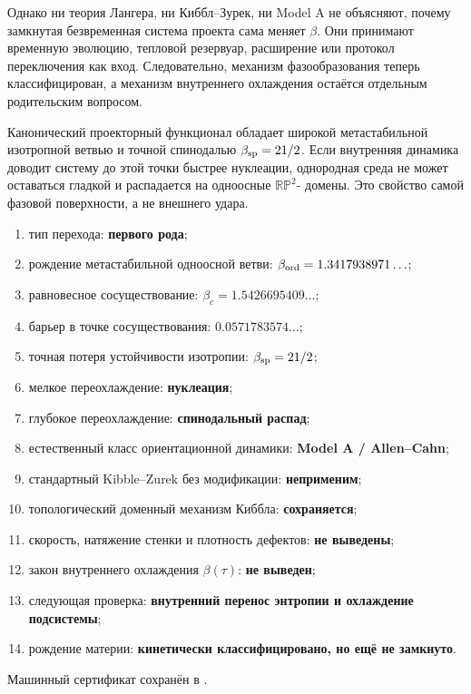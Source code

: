 Однако ни теория Лангера, ни Киббл--Зурек, ни Model A не объясняют, почему
замкнутая безвременная система проекта сама меняет $\beta$. Они принимают
временную эволюцию, тепловой резервуар, расширение или протокол переключения как вход.
Следовательно, механизм фазообразования теперь классифицирован, а механизм
внутреннего охлаждения остаётся отдельным родительским вопросом.

\begin{theorem}
Канонический проекторный функционал обладает широкой метастабильной
изотропной ветвью и точной спинодалью $\beta_{\rm sp}=21/2$. Если внутренняя
динамика доводит систему до этой точки быстрее нуклеации, однородная среда
не может оставаться гладкой и распадается на одноосные $\mathbb{RP}^2$-
домены. Это свойство самой фазовой поверхности, а не внешнего удара.
\end{theorem}

\begin{protocol}
\begin{enumerate}
 \item тип перехода: \textbf{первого рода};
 \item рождение метастабильной одноосной ветви:
 \textbf{$\beta_{\rm ord}=1.3417938971\ldots$};
 \item равновесное сосуществование:
 \textbf{$\beta_c=1.5426695409\ldots$};
 \item барьер в точке сосуществования:
 \textbf{$0.0571783574\ldots$};
 \item точная потеря устойчивости изотропии:
 \textbf{$\beta_{\rm sp}=21/2$};
 \item мелкое переохлаждение: \textbf{нуклеация};
 \item глубокое переохлаждение: \textbf{спинодальный распад};
 \item естественный класс ориентационной динамики:
 \textbf{Model A / Allen--Cahn};
 \item стандартный Kibble--Zurek без модификации:
 \textbf{неприменим};
 \item топологический доменный механизм Киббла:
 \textbf{сохраняется};
 \item скорость, натяжение стенки и плотность дефектов:
 \textbf{не выведены};
 \item закон внутреннего охлаждения $\beta(\tau)$:
 \textbf{не выведен};
 \item следующая проверка:
 \textbf{внутренний перенос энтропии и охлаждение подсистемы};
 \item рождение материи:
 \textbf{кинетически классифицировано, но ещё не замкнуто}.
\end{enumerate}
\end{protocol}

Машинный сертификат сохранён в
.
